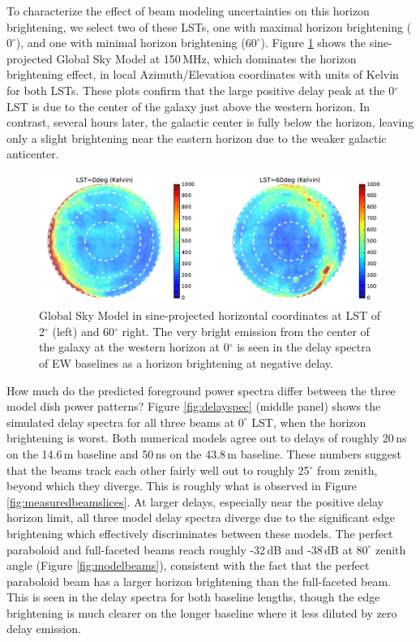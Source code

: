 To characterize the effect of beam modeling uncertainties on this horizon brightening, we select two of these LSTs, one with maximal horizon brightening ($0^\circ$), and one with minimal horizon brightening ($60^\circ$). Figure \ref{fig:gsmplots} shows the sine-projected Global Sky Model at 150\,MHz, which dominates the horizon brightening effect, in local Azimuth/Elevation coordinates with units of Kelvin for both LSTs. These plots confirm that the large positive delay peak at the 0$^\circ$ LST is due to the center of the galaxy just above the western horizon. In contrast, several hours later, the galactic center is fully below the horizon, leaving only a slight brightening near the eastern horizon due to the weaker galactic anticenter. 

\begin{figure}[t]
\centering
\includegraphics[width=6in]{chap3_hera_beammapping/gsm_kelvin_LST_2deg_and_62deg.pdf}
\caption[Global Sky Model.]{Global Sky Model \citep{gsm} in sine-projected horizontal coordinates at LST of 2$^\circ$ (left) and 60$^\circ$ right. The very bright emission from the center of the galaxy at the western horizon at 0$^\circ$ is seen in the delay spectra of EW baselines as a horizon brightening at negative delay.}
\label{fig:gsmplots}
\end{figure}

How much do the predicted foreground power spectra differ between the three model dish power patterns? Figure \ref{fig:delayspec} (middle panel) shows the simulated delay spectra for all three beams at $0^\circ$ LST, when the horizon brightening is worst. Both numerical models agree out to delays of roughly 20\,ns on the 14.6\,m baseline and 50\,ns on the 43.8\,m baseline. These numbers suggest that the beams track each other fairly well out to roughly 25$^\circ$ from zenith, beyond which they diverge. This is roughly what is observed in Figure \ref{fig:measuredbeamslices}. At larger delays, especially near the positive delay horizon limit, all three model delay spectra diverge due to the significant edge brightening which effectively discriminates between these models. The perfect paraboloid and full-faceted beams reach roughly -32\,dB and -38\,dB at $80^\circ$ zenith angle (Figure \ref{fig:modelbeams}), consistent with the fact that the perfect paraboloid beam has a larger horizon brightening than the full-faceted beam. This is seen in the delay spectra for both baseline lengths, though the edge brightening is much clearer on the longer baseline where it less diluted by zero delay emission.  


